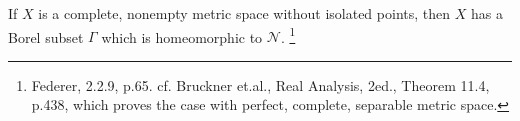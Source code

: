 \begin{theorem}
If $X$ is a complete, nonempty metric space without isolated points, then 
$X$ has a Borel subset $\Gamma$ which is homeomorphic to 
$\mathcal{N}$. 
\footnote{Federer, 2.2.9, p.65. cf. Bruckner et.al., Real Analysis, 2ed.,
	Theorem 11.4, p.438, which proves the case with perfect, complete, 
	separable metric space.}
\end{theorem}
